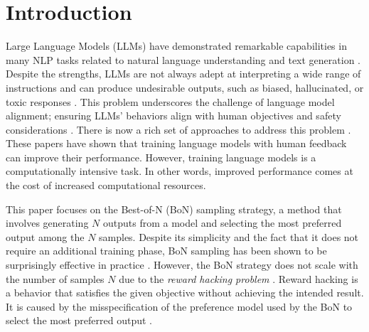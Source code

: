 \section{Introduction}

Large Language Models (LLMs) have demonstrated remarkable capabilities in many NLP tasks related to natural language understanding and text generation \citep{stiennon2020,NEURIPS2022_b1efde53,touvron2023llama,dubey2024llama,openai2024gpt4}.
Despite the strengths, LLMs are not always adept at interpreting a wide range of instructions and can produce undesirable outputs, such as biased, hallucinated, or toxic responses \citep{bai2022training,lin-etal-2022-truthfulqa,touvron2023llama,casper2023open,guan2024hallusionbench}.
This problem underscores the challenge of language model alignment; ensuring LLMs' behaviors align with human objectives and safety considerations \citep{ziegler2020finetuning,stiennon2020,NEURIPS2022_b1efde53}.
There is now a rich set of approaches to address this problem \citep{stiennon2020,NEURIPS2022_b1efde53,NEURIPS2023_a85b405e}. These papers have shown that training language models with human feedback can improve their performance. However, training language models is a computationally intensive task. In other words, improved performance comes at the cost of increased computational resources.

This paper focuses on the Best-of-N (BoN) sampling strategy, a method that involves generating $N$ outputs from a model and selecting the most preferred output among the $N$ samples. Despite its simplicity and the fact that it does not require an additional training phase, BoN sampling has been shown to be surprisingly effective in practice \citep{stiennon2020,nakano2022webgpt}. However, the BoN strategy does not scale with the number of samples $N$ due to the \textit{reward hacking problem} \citep{amodei2016concrete,ziegler2020finetuning,stiennon2020,NEURIPS2022_3d719fee,pmlr-v202-gao23h}. Reward hacking is a behavior that satisfies the given objective without achieving the intended result. 
It is caused by the misspecification of the preference model used by the BoN to select the most preferred output \citep{pan2022the,lambert2024alignment}.

